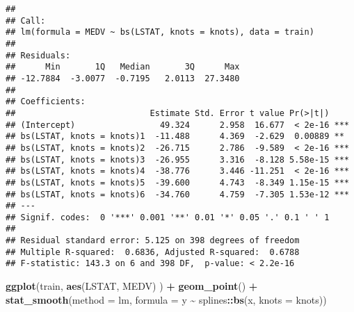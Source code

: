 \documentclass[
]{article}
\newenvironment{Shaded}{\begin{snugshade}}{\end{snugshade}}
\newcommand{\AttributeTok}[1]{\textcolor[rgb]{0.13,0.29,0.53}{#1}}
\newcommand{\CommentTok}[1]{\textcolor[rgb]{0.56,0.35,0.01}{\textit{#1}}}
\newcommand{\DecValTok}[1]{\textcolor[rgb]{0.00,0.00,0.81}{#1}}
\newcommand{\FloatTok}[1]{\textcolor[rgb]{0.00,0.00,0.81}{#1}}
\newcommand{\FunctionTok}[1]{\textcolor[rgb]{0.13,0.29,0.53}{\textbf{#1}}}
\newcommand{\NormalTok}[1]{#1}
\newcommand{\OtherTok}[1]{\textcolor[rgb]{0.56,0.35,0.01}{#1}}
\newcommand{\SpecialCharTok}[1]{\textcolor[rgb]{0.81,0.36,0.00}{\textbf{#1}}}
\begin{document}
\begin{Shaded}
\end{Shaded}

\begin{verbatim}
## 
## Call:
## lm(formula = MEDV ~ bs(LSTAT, knots = knots), data = train)
## 
## Residuals:
##      Min       1Q   Median       3Q      Max 
## -12.7884  -3.0077  -0.7195   2.0113  27.3480 
## 
## Coefficients:
##                           Estimate Std. Error t value Pr(>|t|)    
## (Intercept)                 49.324      2.958  16.677  < 2e-16 ***
## bs(LSTAT, knots = knots)1  -11.488      4.369  -2.629  0.00889 ** 
## bs(LSTAT, knots = knots)2  -26.715      2.786  -9.589  < 2e-16 ***
## bs(LSTAT, knots = knots)3  -26.955      3.316  -8.128 5.58e-15 ***
## bs(LSTAT, knots = knots)4  -38.776      3.446 -11.251  < 2e-16 ***
## bs(LSTAT, knots = knots)5  -39.600      4.743  -8.349 1.15e-15 ***
## bs(LSTAT, knots = knots)6  -34.760      4.759  -7.305 1.53e-12 ***
## ---
## Signif. codes:  0 '***' 0.001 '**' 0.01 '*' 0.05 '.' 0.1 ' ' 1
## 
## Residual standard error: 5.125 on 398 degrees of freedom
## Multiple R-squared:  0.6836, Adjusted R-squared:  0.6788 
## F-statistic: 143.3 on 6 and 398 DF,  p-value: < 2.2e-16
\end{verbatim}

\begin{Shaded}
\begin{Highlighting}[]
\FunctionTok{ggplot}\NormalTok{(train, }\FunctionTok{aes}\NormalTok{(LSTAT, MEDV) ) }\SpecialCharTok{+} \FunctionTok{geom\_point}\NormalTok{() }\SpecialCharTok{+}
\FunctionTok{stat\_smooth}\NormalTok{(}\AttributeTok{method =}\NormalTok{ lm, }\AttributeTok{formula =}\NormalTok{ y }\SpecialCharTok{\textasciitilde{}}\NormalTok{ splines}\SpecialCharTok{::}\FunctionTok{bs}\NormalTok{(x, }\AttributeTok{knots =}\NormalTok{ knots))}
\end{Highlighting}
\end{Shaded}
\end{document}
